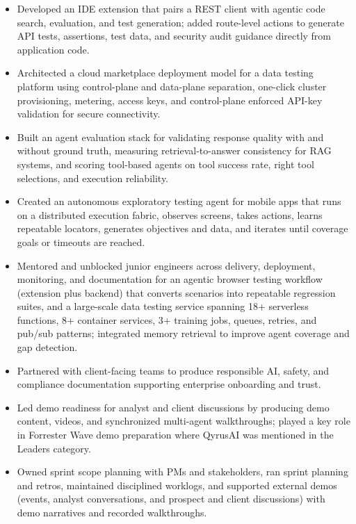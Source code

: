 \documentclass[11pt,a4paper]{article}
\begin{document}
\begin{itemize}
    \item Developed an IDE extension that pairs a REST client with agentic code search, evaluation, and test generation; added route-level actions to generate API tests, assertions, test data, and security audit guidance directly from application code.
    \item Architected a cloud marketplace deployment model for a data testing platform using control-plane and data-plane separation, one-click cluster provisioning, metering, access keys, and control-plane enforced API-key validation for secure connectivity.
    \item Built an agent evaluation stack for validating response quality with and without ground truth, measuring retrieval-to-answer consistency for RAG systems, and scoring tool-based agents on tool success rate, right tool selections, and execution reliability.
    \item Created an autonomous exploratory testing agent for mobile apps that runs on a distributed execution fabric, observes screens, takes actions, learns repeatable locators, generates objectives and data, and iterates until coverage goals or timeouts are reached.
    \item Mentored and unblocked junior engineers across delivery, deployment, monitoring, and documentation for an agentic browser testing workflow (extension plus backend) that converts scenarios into repeatable regression suites, and a large-scale data testing service spanning 18+ serverless functions, 8+ container services, 3+ training jobs, queues, retries, and pub/sub patterns; integrated memory retrieval to improve agent coverage and gap detection.
    \item Partnered with client-facing teams to produce responsible AI, safety, and compliance documentation supporting enterprise onboarding and trust.
    \item Led demo readiness for analyst and client discussions by producing demo content, videos, and synchronized multi-agent walkthroughs; played a key role in Forrester Wave demo preparation where QyrusAI was mentioned in the Leaders category.
    \item Owned sprint scope planning with PMs and stakeholders, ran sprint planning and retros, maintained disciplined worklogs, and supported external demos (events, analyst conversations, and prospect and client discussions) with demo narratives and recorded walkthroughs.
\end{itemize}
\end{document}
